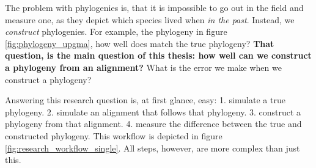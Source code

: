 The problem with phylogenies is, 
that it is impossible to go out in the field and measure one, 
as they depict which species lived when \emph{in the past}.
Instead, we \emph{construct} phylogenies. For example,
the phylogeny in figure \ref{fig:phylogeny_upgma}, how well
does match the true phylogeny? \textbf{That question, is the main question of this 
thesis: how well can we construct a
phylogeny from an alignment?} What is the error we
make when we construct a phylogeny?

Answering this research question is, at first glance, easy: 
1. simulate a true phylogeny.
2. simulate an alignment that follows that phylogeny.
3. construct a phylogeny from that alignment.
4. measure the difference between the true and constructed phylogeny.
This workflow is depicted in figure \ref{fig:research_workflow_single}.
All steps, however, are more complex than just this.

